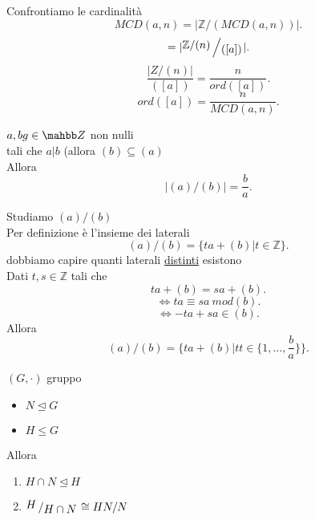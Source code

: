 \documentclass[12px]{article}
\begin{document}
	Confrontiamo le cardinalità\\
	\[
	MCD(a,n) = |\mathbb Z/(MCD(a,n))|
	.\] 
	\[
		= |\bigslant{\mathbb Z/ (n)}{([a])}|

	.\] 
	\[
		\frac {|Z/(n)|}{([a])} = \frac n {ord([a])}
	.\] 
	\[
		ord([a]) = \frac n {MCD(a,n)}
	.\] 
	\begin{lemm}
		$a,bg\in \mahbb Z$ non nulli\\
		tali che  $a|b$ (allora  $(b)\subseteq (a)$ \\
		Allora\\
		\[
		|(a)/(b)| = \frac ba
		.\] 
	\end{lemm}
	\begin{dimo}
		Studiamo $(a)/(b)$\\
		Per definizione è l'insieme dei laterali\\
		 \[
			 (a)/(b) = \{ta + (b) | t\in \mathbb Z\}
		.\] 
		dobbiamo capire quanti laterali \underline{distinti} esistono\\
		Dati $t,s\in \mathbb Z$ tali che\\
		\[
		ta + (b) = sa + (b)
		.\] 
		\[
		\Leftrightarrow ta \equiv sa \ mod(b)
		.\] 
		\[
		\Leftrightarrow -ta + sa \in(b)
		.\] 
		Allora\\
		\[
			(a)/(b) = \{ta + (b)|tt\in\{1,\ldots,\frac ba\}\}
		.\] 
	\end{dimo}
	\newpage
	\begin{teo}
		$(G,\cdot)$ gruppo\\
		\begin{itemize}
			\item $N\trianglelefteq G$\\
			\item  $H\leq G$
		\end{itemize}
		Allora
		\begin{enumerate}
			\item$H\cap N\trianglelefteq H$\\
			\item  $\bigslant H {H\cap N}\cong HN/N$
		\end{enumerate}
	\end{teo}
\end{document}
